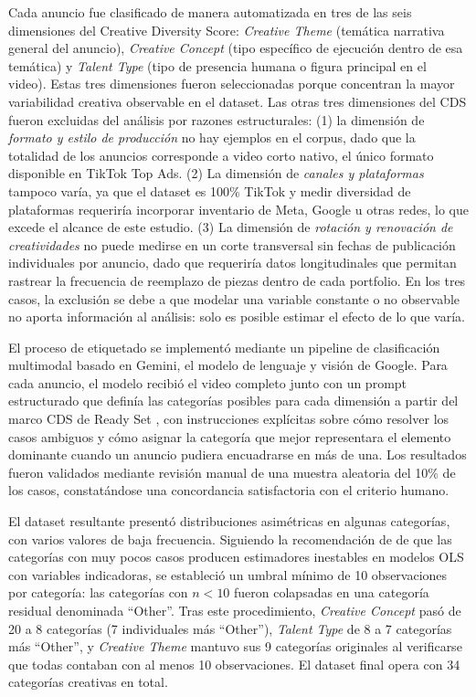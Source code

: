 \documentclass[12pt, a4paper]{report}
\begin{document}
Cada anuncio fue clasificado de manera automatizada en tres de las seis dimensiones
del Creative Diversity Score: \textit{Creative Theme} (temática narrativa general del anuncio),
\textit{Creative Concept} (tipo específico de ejecución dentro de esa temática) y \textit{Talent
Type} (tipo de presencia humana o figura principal en el video). Estas tres dimensiones fueron seleccionadas porque concentran la mayor variabilidad
creativa observable en el dataset. Las otras tres dimensiones del CDS fueron excluidas
del análisis por razones estructurales: (1) la dimensión
de \textit{formato y estilo de producción} no hay ejemplos en el corpus, dado que la
totalidad de los anuncios corresponde a video corto nativo, el único formato disponible
en TikTok Top Ads. (2) La dimensión de \textit{canales y plataformas} tampoco varía,
ya que el dataset es 100\% TikTok y medir diversidad de plataformas requeriría
incorporar inventario de Meta, Google u otras redes, lo que excede el alcance de este
estudio. (3) La dimensión de \textit{rotación y renovación de creatividades} no puede
medirse en un corte transversal sin fechas de publicación individuales por anuncio,
dado que requeriría datos longitudinales que permitan rastrear la frecuencia de
reemplazo de piezas dentro de cada portfolio. En los tres casos, la exclusión se debe
a que modelar una variable constante o no observable no aporta información al análisis:
solo es posible estimar el efecto de lo que varía.

El proceso de etiquetado se implementó mediante un pipeline de clasificación multimodal
basado en Gemini, el modelo de lenguaje y visión de Google. Para cada anuncio, el modelo
recibió el video completo junto con un prompt estructurado que definía las categorías
posibles para cada dimensión a partir del marco CDS de Ready Set \citep{readyset2025},
con instrucciones explícitas sobre cómo resolver los casos ambiguos y cómo asignar la
categoría que mejor representara el elemento dominante cuando un anuncio pudiera
encuadrarse en más de una. Los resultados fueron validados mediante revisión manual de
una muestra aleatoria del 10\% de los casos, constatándose una concordancia satisfactoria
con el criterio humano.

El dataset resultante presentó distribuciones asimétricas en algunas categorías, con varios
valores de baja frecuencia. Siguiendo la recomendación de \citet[Cap.~5]{fox2016} de que las
categorías con muy pocos casos producen estimadores inestables en modelos OLS con variables
indicadoras, se estableció un umbral mínimo de 10 observaciones por categoría: las categorías
con $n < 10$ fueron colapsadas en una categoría residual denominada ``Other''. Tras este
procedimiento, \textit{Creative Concept} pasó de 20 a 8 categorías (7 individuales más
``Other''), \textit{Talent Type} de 8 a 7 categorías más ``Other'', y \textit{Creative Theme}
mantuvo sus 9 categorías originales al verificarse que todas contaban con al menos 10
observaciones. El dataset final opera con 34 categorías creativas en total.
\end{document}
